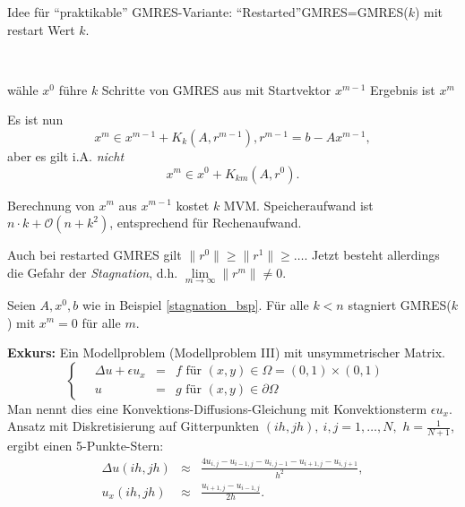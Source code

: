 Idee f\"ur "`praktikable"' GMRES-Variante: "`Restarted"'GMRES=GMRES($k$)
mit restart Wert $k$.
\begin{alg}[GMRES($k$)]
~               %
\vspace*{-2\baselineskip}       %
\begin{algorithm}
  \begin{algorithmic}
    \STATE w\"ahle $x^0$
      \STATE f\"uhre $k$ Schritte von GMRES aus mit Startvektor $x^{m-1}$
      \STATE Ergebnis ist $x^m$
    \ENDFOR
  \end{algorithmic}
\end{algorithm}
\end{alg}
Es ist nun $$ x^m \in x^{m-1}+K_k(A,r^{m-1}), r^{m-1}=b-Ax^{m-1},$$
aber es gilt i.A. {\em nicht}
\[
x^m \in x^0 + K_{km}(A,r^0).
\]

\begin{bem}
Berechnung von $x^m$ aus $x^{m-1}$ kostet $k$ MVM. Speicheraufwand
ist $n\cdot k+\mathcal{O}(n+k^2)$, entsprechend f\"ur Rechenaufwand.
\end{bem}

Auch bei restarted GMRES gilt  $\|r^0\| \geq \|r^1\|\geq \ldots $.
Jetzt besteht allerdings die Gefahr der \emph{Stagnation}, d.h. 
$\lim\limits_{m\rightarrow\infty} \|r^m\|\not=0.$
\begin{bsp}
Seien $A,x^0,b$ wie in Beispiel \ref{stagnation_bsp}.
F\"ur alle $k<n$ stagniert GMRES($k$) mit $x^m=0$ f\"ur alle $m$.
\end{bsp}

{\bf Exkurs:} Ein Modellproblem (Modellproblem III) mit
unsymmetrischer Matrix.
\begin{equation} \label{conv_diff_eq}
\left\{ \quad
\begin{array}{rcl}
\Delta u + \epsilon u_x &=& f  \text{ f\"ur } (x,y)\in\Omega=(0,1)\times(0,1)\\
u &=& g   \text{ f\"ur } (x,y)\in \partial \Omega 
\end{array}
\quad
\right.
\end{equation}
Man nennt dies eine Konvektions-Diffusions-Gleichung mit Konvektionsterm
$\epsilon u_x$.
Ansatz mit Diskretisierung auf Gitterpunkten $(ih,jh),\ i,j=1,\ldots,N,$ $h=\frac{1}{N+1}$,
ergibt einen 5-Punkte-Stern:
\begin{eqnarray*}
\Delta u(ih,jh) & \approx & \frac{4u_{i,j}-u_{i-1,j}-u_{i,j-1}-u_{i+1,j}-u_{i,j+1}}{h^2}, \\
 u_x(ih,jh) & \approx & \frac{u_{i+1,j}-u_{i-1,j}}{2h}.
\end{eqnarray*}

